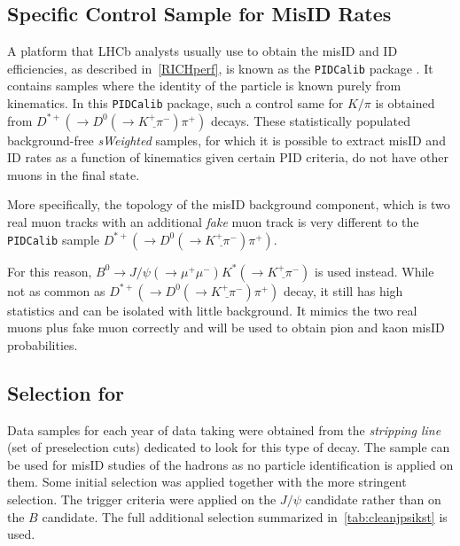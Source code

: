 \subsection{Specific Control Sample for  MisID Rates }
\label{extraction}
A platform that \gls{LHCb} analysts usually use to obtain the misID and ID efficiencies, as described in~\autoref{RICHperf}, is known as the \texttt{PIDCalib} package \cite{Anderlini:2202412}. It contains samples where the identity of the particle is known purely from kinematics.  In this \texttt{PIDCalib} package, such a control same for $K/\pi$ is obtained from $D^{*+}(\rightarrow D^{0}(\rightarrow \underline{K^{+} \pi^{-}}) \pi^{+})$ decays. These statistically populated background-free \textit{sWeighted} samples\cite{sPlot}, for which it is possible to extract misID and ID rates as a function of kinematics given certain \gls{PID} criteria, do not have other muons in the final state. 

More specifically, the topology of the misID background component, which is two real muon tracks with an additional \textit{fake} muon track is very different to the \texttt{PIDCalib} sample $D^{*+}(\rightarrow D^{0}(\rightarrow \underline{K^{+} \pi^{-}}) \pi^{+})$.%


For this reason, $B^{0} \rightarrow J/\psi(\rightarrow \mu^{+} \mu^{-}) K^{*}(\rightarrow \underline{K^{+} \pi^{-}})$ is used instead. While not as common as $D^{*+}(\rightarrow D^{0}(\rightarrow \underline{K^{+} \pi^{-}}) \pi^{+})$ decay, it still has high statistics and can be isolated with little background. It mimics the two real muons plus fake muon correctly and will be used to obtain pion and kaon misID probabilities.

\subsection{Selection for   }
Data samples for each year of data taking were obtained from the \textit{stripping line} (set of preselection cuts) dedicated to look for this type of decay. The sample can be used for misID studies of the hadrons as no particle identification is applied on them. Some initial selection was applied together with the more stringent \Bmumumu selection.  The trigger criteria were applied on the $J/\psi$ candidate rather than on the $B$ candidate. The full additional selection summarized in~\autoref{tab:cleanjpsikst} is used.


